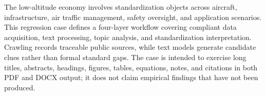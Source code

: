 \begin{enabstract}
The low-altitude economy involves standardization objects across aircraft,
infrastructure, air traffic management, safety oversight, and application
scenarios. This regression case defines a four-layer workflow covering
compliant data acquisition, text processing, topic analysis, and
standardization interpretation. Crawling records traceable public sources,
while text models generate candidate clues rather than formal standard gaps.
The case is intended to exercise long titles, abstracts, headings, figures,
tables, equations, notes, and citations in both PDF and DOCX output; it does
not claim empirical findings that have not been produced.

\end{enabstract}
